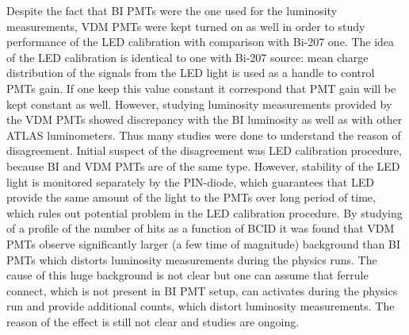 Despite the fact that BI PMTs were the one used for the luminosity measurements, 
VDM PMTs were kept turned on as well in order to study performance of the LED calibration with comparison with Bi-207 one.
The idea of the LED calibration is identical to one with Bi-207 source: mean charge distribution of the signals from the LED light
is used as a handle to control PMTs gain. If one keep this value constant it correspond that PMT gain will be kept constant as well.
However, studying luminosity measurements provided by the VDM PMTs showed discrepancy with the BI luminosity as well as with other ATLAS
luminometers. Thus many studies were done to understand the reason of disagreement.
Initial suspect of the disagreement was LED calibration procedure, because BI and VDM PMTs are of the same type.
However, stability of the LED light is monitored separately by the PIN-diode, which guarantees that LED provide the same 
amount of the light to the PMTs over long period of time, which rules out potential problem in the LED calibration procedure.
By studying of a profile of the number of hits as a function of BCID it was found that VDM PMTs observe significantly larger (a few time of magnitude)
background than BI PMTs which distorts luminosity measurements during the physics runs. The cause of this huge background is not clear but one can
assume that ferrule connect, which is not present in BI PMT setup, can activates during the physics run and provide additional counts, which 
distort luminosity measurements. The reason of the effect is still not clear and studies are ongoing.

% 

